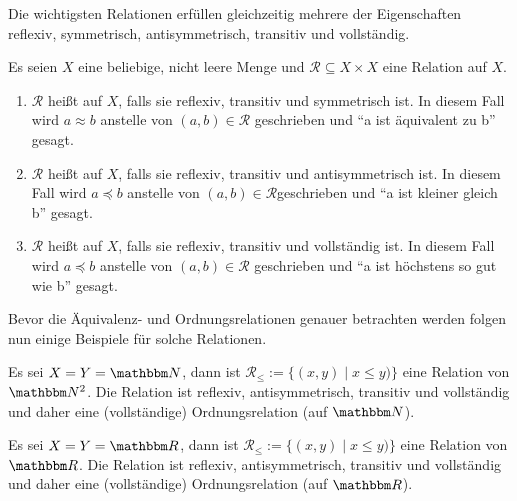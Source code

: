 \begin{Unit}
Die wichtigsten Relationen erfüllen gleichzeitig mehrere der Eigenschaften 
reflexiv, symmetrisch, antisymmetrisch, transitiv und voll\-stän\-dig.

\begin{Definition}
  Es seien $X$ eine beliebige, nicht leere Menge und $\mathcal{R} \subseteq X 
  \times X$ eine Relation auf $X$.
  \begin{enumerate}
    \item $\mathcal{R}$ heißt  auf $X$, falls
      sie reflexiv, transitiv und symmetrisch ist. In diesem Fall wird 
      $a \approx b$ anstelle von $(a, b) \in \mathcal{R}$ geschrieben und 
      \enquote{a ist äquivalent zu b} gesagt. 
    \item $\mathcal{R}$ heißt  auf $X$, falls sie 
      reflexiv, transitiv und antisymmetrisch ist. In diesem Fall wird 
      $a \preceq b$ anstelle von $(a, b) \in \mathcal{R}$geschrieben und 
      \enquote{a ist kleiner gleich b} gesagt. 
    \item $\mathcal{R}$ heißt  auf $X$, falls 
      sie reflexiv, transitiv und voll\-ständig ist. In diesem Fall wird 
      $a \preceq b$ anstelle von $(a, b) \in \mathcal{R}$ geschrieben und 
      \enquote{a ist höchstens so gut wie b} gesagt.
  \end{enumerate}
\end{Definition}

Bevor die Äquivalenz- und Ordnungsrelationen genauer betrachten werden 
folgen nun einige Beispiele für solche Relationen.
\end{Unit}

\begin{Unit}[Beispiel] 
  Es sei $X = Y = \NN$, dann ist $\mathcal{R}_{\leq} := \{ (x,y) \mid x 
  \leq y) \}$ eine Relation von $\NN^2$. Die Relation ist reflexiv, 
  antisymmetrisch, transitiv und vollständig und daher eine (vollständige)
  Ordnungsrelation (auf $\NN$).
\end{Unit}

\begin{Unit}[Beispiel] 
  Es sei $X = Y = \RR$, dann ist $\mathcal{R}_{\leq} := \{ (x,y) \mid x 
  \leq y) \}$ eine Relation von $\RR$. Die Relation ist reflexiv, 
  antisymmetrisch, transitiv und vollständig und daher eine (vollständige)
  Ordnungsrelation (auf $\RR$).
\end{Unit}

